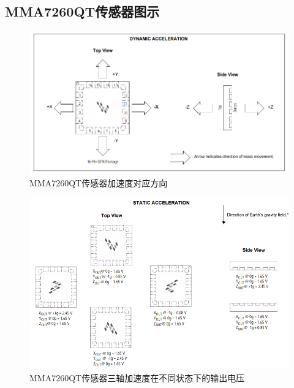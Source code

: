 \subsection{MMA7260QT传感器图示}

\begin{figure}[H]
\centering
\includegraphics[width=12cm]{figure/lab2.1.5.png}
\caption{MMA7260QT传感器加速度对应方向} \label{fig:2.1.5}
\end{figure}

\begin{figure}[H]
\centering
\includegraphics[width=12cm]{figure/lab2.1.6.png}
\caption{MMA7260QT传感器三轴加速度在不同状态下的输出电压} \label{fig:2.1.6}
\end{figure}
